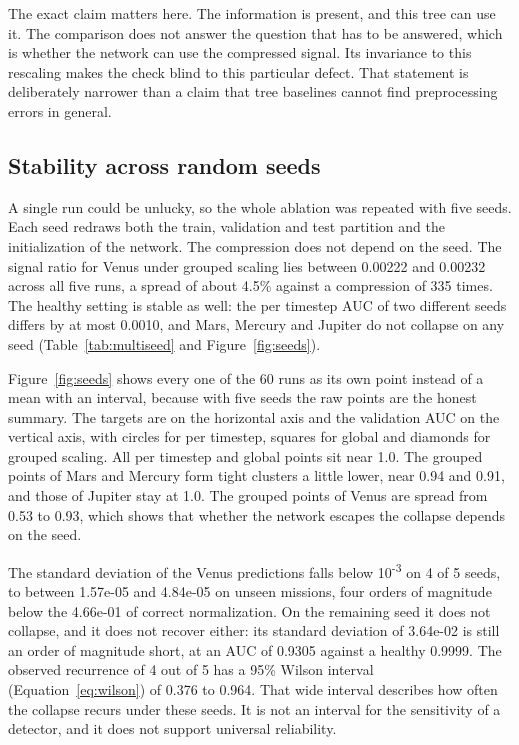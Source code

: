 The exact claim matters here. The information is present, and this tree can use it. The comparison does not answer the question that has to be answered, which is whether the network can use the compressed signal. Its invariance to this rescaling makes the check blind to this particular defect. That statement is deliberately narrower than a claim that tree baselines cannot find preprocessing errors in general.

\subsection{Stability across random seeds}
\label{sec:seeds}

A single run could be unlucky, so the whole ablation was repeated with five seeds. Each seed redraws both the train, validation and test partition and the initialization of the network. The compression does not depend on the seed. The signal ratio for Venus under grouped scaling lies between 0.00222 and 0.00232 across all five runs, a spread of about 4.5\% against a compression of 335 times. The healthy setting is stable as well: the per timestep AUC of two different seeds differs by at most 0.0010, and Mars, Mercury and Jupiter do not collapse on any seed (Table~\ref{tab:multiseed} and Figure~\ref{fig:seeds}).



Figure~\ref{fig:seeds} shows every one of the 60 runs as its own point instead of a mean with an interval, because with five seeds the raw points are the honest summary. The targets are on the horizontal axis and the validation AUC on the vertical axis, with circles for per timestep, squares for global and diamonds for grouped scaling. All per timestep and global points sit near 1.0. The grouped points of Mars and Mercury form tight clusters a little lower, near 0.94 and 0.91, and those of Jupiter stay at 1.0. The grouped points of Venus are spread from 0.53 to 0.93, which shows that whether the network escapes the collapse depends on the seed.

The standard deviation of the Venus predictions falls below 10\textsuperscript{-3} on 4 of 5 seeds, to between 1.57e-05 and 4.84e-05 on unseen missions, four orders of magnitude below the 4.66e-01 of correct normalization. On the remaining seed it does not collapse, and it does not recover either: its standard deviation of 3.64e-02 is still an order of magnitude short, at an AUC of 0.9305 against a healthy 0.9999. The observed recurrence of 4 out of 5 has a 95\% Wilson interval (Equation~\ref{eq:wilson}) of 0.376 to 0.964. That wide interval describes how often the collapse recurs under these seeds. It is not an interval for the sensitivity of a detector, and it does not support universal reliability.

